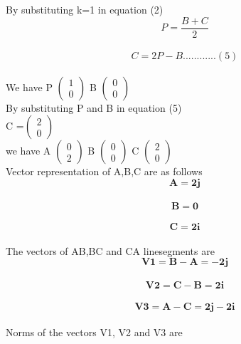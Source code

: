 \documentclass[10pt,a4paper]{report}
\let\vec\mathbf
\begin{document}
\begin{multicols}{2}
\vspace{2mm}
By substituting k=1 in equation (2) \\ 
\vspace{3mm}
\begin{equation}
P=\frac{B+C}{2}
\end{equation} \\
\begin{equation}
C=2P-B............(5)
\end{equation} \\
We have P  $ \begin{pmatrix} 
1 \\
0
\end{pmatrix} $  
B $ \begin{pmatrix} 
0 \\
0
\end{pmatrix} $ \\By substituting P and B in equation (5)\\
\vspace{3mm}
C =$ \begin{pmatrix} 
2 \\
0
\end{pmatrix} $ \\
\vspace{2mm}
we have A $ \begin{pmatrix} 
0 \\
2
\end{pmatrix} $  \hspace{2mm}
B $ \begin{pmatrix} 
0 \\
0
\end{pmatrix} $  \hspace{4mm}
C $ \begin{pmatrix}
2 \\
0
\end{pmatrix} $  \\ 
\vspace{2mm}
Vector representation of A,B,C are as follows
\begin{equation}
\vec{A=2j}
\end{equation}\\
\begin{equation}
\vec{B=0}
\end{equation}\\
\begin{equation}
\vec{C=2i}
\end{equation}\\
The vectors of AB,BC and CA linesegments are   \\
\begin{equation}
\vec{V1   = B-A=-2j}
\end{equation}\\
\begin{equation}
\vec{V2 = C-B=2i}
\end{equation}\\
\begin{equation}
\vec{V3 = A-C=2j-2i}
\end{equation} \\
Norms of the vectors V1, V2 and V3 are 


\end{multicols}
\end{document}
